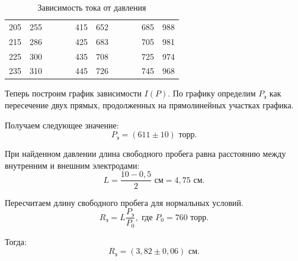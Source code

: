 \begin{enumerate}
\begin{table}[h!]
\begin{tabular}{|r|r|rll|r|r|rll|r|r|}
					205                             & 255                          &  &  &  & 415                            & 652                          &  &  &  & 685                            & 988                          \\ \cline{1-2} \cline{6-7} \cline{11-12} 
					215                             & 286                          &  &  &  & 425                            & 683                          &  &  &  & 705                            & 981                          \\ \cline{1-2} \cline{6-7} \cline{11-12} 
					225                             & 300                          &  &  &  & 435                            & 708                          &  &  &  & 725                            & 974                          \\ \cline{1-2} \cline{6-7} \cline{11-12} 
					235                             & 310                          &  &  &  & 445                            & 726                          &  &  &  & 745                            & 968                          \\ \cline{1-2} \cline{6-7} \cline{11-12} 
				\end{tabular}
			\caption{Зависимость тока от давления}
			\label{AlphaParticles_I(P)}
		\end{table}	
	
	
		Теперь построим график зависимости $I(P)$.
		По графику определим $P_\text{э}$ как пересечение двух прямых, продолженных на прямолинейных участках графика.
		
		Получаем следующее значение:
		\begin{equation*}
			P_\text{э} = (611 \pm 10) \text{ торр}.
		\end{equation*}
	
		При найденном давлении длина свободного пробега равна расстоянию
		между внутренним и внешним электродами:
		\begin{equation*}
			L = \frac{10-0,5}{2} \text{ см} = 4,75 \text{ см}.
		\end{equation*}
	
		Пересчитаем длину свободного пробега для нормальных условий.
		\begin{equation*}
			R_\text{э} = L\frac{P_\text{э}}{P_0}, \text{ где } P_0 = 760 \text{ торр}.
		\end{equation*}
		
		Тогда:
		\begin{equation*}
			R_\text{э} = (3,82 \pm 0,06) \text{ см}.
		\end{equation*}	
	

\end{enumerate}
